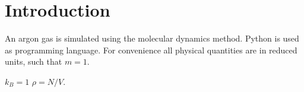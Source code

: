 \section{Introduction}
An argon gas is simulated using the molecular dynamics method. Python is used as programming language.
For convenience all physical quantities are in reduced units, such that $m=1$. 



$k_B=1$ $\rho=N/V$.